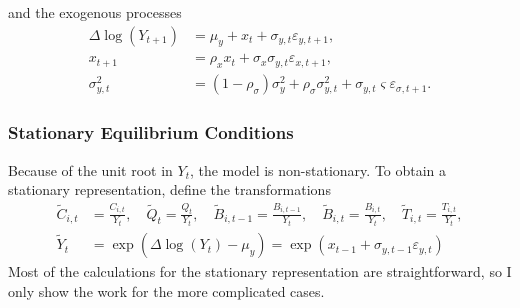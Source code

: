 \documentclass[12 pt, oneside]{article}
\theoremstyle{definition}
\theoremstyle{definition}
\theoremstyle{definition}
\begin{document}
and the exogenous processes
\begin{align}
  \label{eq:endowment growth eqm}
  \Delta \log(Y_{t + 1}) & = \mu_y + x_t + \sigma_{y, t} \varepsilon_{y, t + 1},\\
  \label{eq:long run risk eqm}
  x_{t + 1} & = \rho_x x_t + \sigma_x \sigma_{y, t} \varepsilon_{x, t + 1},\\
  \label{eq:stochastic volatility eqm}
  \sigma_{y, t}^2 & = (1 - \rho_\sigma) \sigma_y^2 + \rho_\sigma \sigma_{y, t}^2 + \sigma_{y, t}\varsigma \varepsilon_{\sigma, t + 1}.
\end{align}

\subsubsection{Stationary Equilibrium Conditions}
Because of the unit root in $Y_t$, the model is non-stationary. To obtain a stationary representation, define the transformations
\begin{align}
  \tilde{C}_{i, t} & = \frac{C_{i, t}}{Y_t}, \quad \tilde{Q}_t = \frac{Q_t}{Y_t}, \quad  \tilde{B}_{i, t - 1} = \frac{B_{i, t - 1}}{Y_t}, \quad \tilde{B}_{i, t} = \frac{B_{i, t}}{Y_t}, \quad \tilde{T}_{i, t} = \frac{T_{i, t}}{Y_t},\\
  \tilde{Y}_t & = \exp(\Delta \log(Y_t) - \mu_y) = \exp(x_{t - 1} + \sigma_{y, t - 1} \varepsilon_{y, t})
\end{align}
Most of the calculations for the stationary representation are straightforward, so I only show the work for the more complicated cases.
\end{document}
